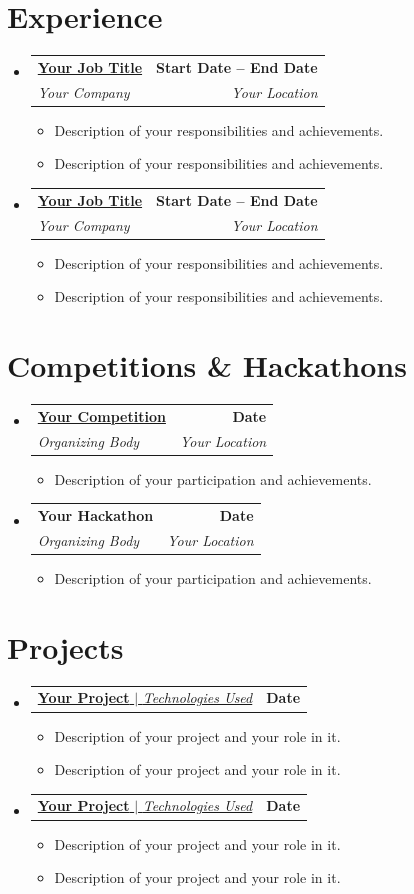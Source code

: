 \documentclass[a4paper,11pt]{article}
\makeatletter
\newcommand{\resumeItem}[1]{\item\small{{#1 \vspace{-2pt}}}}
\newcommand{\resumeSubheading}[4]{
  \vspace{-2pt}\item
    \begin{tabular*}{0.97\textwidth}[t]{l@{\extracolsep{\fill}}r}
      \textbf{#1} & \textbf{\small #2} \\
      \textit{\small#3} & \textit{\small #4} \\
    \end{tabular*}\vspace{-7pt}
}
\newcommand{\resumeProjectHeading}[2]{
  \item
    \begin{tabular*}{0.97\textwidth}{l@{\extracolsep{\fill}}r}
      \small#1 & \textbf{\small #2} \\
    \end{tabular*}\vspace{-7pt}
}
\newcommand{\resumeSubHeadingListStart}{\begin{itemize}[leftmargin=0.15in, label={}]}
\newcommand{\resumeSubHeadingListEnd}{\end{itemize}}
\newcommand{\resumeItemListStart}{\begin{itemize}}
\newcommand{\resumeItemListEnd}{\end{itemize}\vspace{-5pt}}
\makeatother
\begin{document}
\section{Experience}
  \resumeSubHeadingListStart
    \resumeSubheading
      {\href{https://yourcompany.com}{Your Job Title}}{Start Date -- End Date}
      {Your Company}{Your Location}
      \resumeItemListStart
        \resumeItem{Description of your responsibilities and achievements.}
        \resumeItem{Description of your responsibilities and achievements.}
      \resumeItemListEnd
    \resumeSubheading
      {\href{https://yourcompany.com}{Your Job Title}}{Start Date -- End Date}
      {Your Company}{Your Location}
      \resumeItemListStart
        \resumeItem{Description of your responsibilities and achievements.}
        \resumeItem{Description of your responsibilities and achievements.}
      \resumeItemListEnd
  \resumeSubHeadingListEnd

\section{Competitions \& Hackathons}
  \resumeSubHeadingListStart
    \resumeSubheading
      {\href{https://yourcompetition.com}{Your Competition}}{Date}
      {Organizing Body}{Your Location}
      \resumeItemListStart
        \resumeItem{Description of your participation and achievements.}
      \resumeItemListEnd
    \resumeSubheading
      {Your Hackathon}{Date}
      {Organizing Body}{Your Location}
      \resumeItemListStart
        \resumeItem{Description of your participation and achievements.}
      \resumeItemListEnd
  \resumeSubHeadingListEnd

\section{Projects}
  \resumeSubHeadingListStart
    \resumeProjectHeading
      {\href{https://github.com/yourprofile/yourproject}{{\textbf{Your Project}} $|$ \emph{Technologies Used}}}{Date}
      \resumeItemListStart \vspace{0pt}
        \resumeItem{Description of your project and your role in it.}
        \resumeItem{Description of your project and your role in it.}
      \resumeItemListEnd
    \resumeProjectHeading
      {\href{https://github.com/yourprofile/yourproject}{{\textbf{Your Project}} $|$ \emph{Technologies Used}}}{Date}
      \resumeItemListStart \vspace{0pt}
        \resumeItem{Description of your project and your role in it.}
        \resumeItem{Description of your project and your role in it.}
      \resumeItemListEnd
  \resumeSubHeadingListEnd
\end{document}

